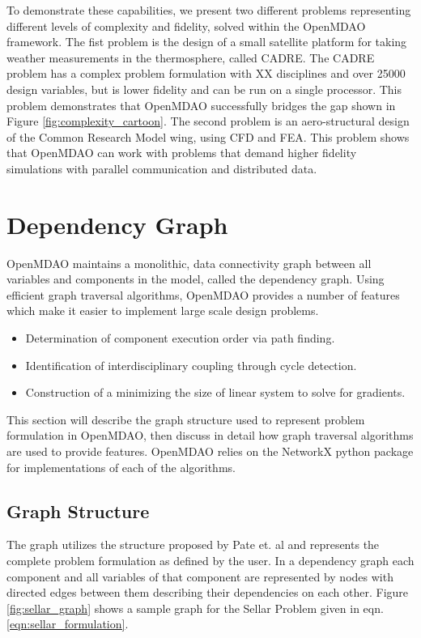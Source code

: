 \documentclass[]{aiaa-tc} %
\begin{document}
    To demonstrate these capabilities, we present two different problems representing different levels of 
    complexity and fidelity, solved within the OpenMDAO framework. The fist problem is the design of a small 
    satellite platform for taking weather measurements in the thermosphere, called CADRE. The CADRE problem has a 
    complex problem formulation with XX disciplines and over 25000 design variables, but is lower fidelity and can 
    be run on a single processor. This problem demonstrates that OpenMDAO successfully bridges the gap shown 
    in Figure \ref{fig:complexity_cartoon}. The second problem is an aero-structural design of the Common Research 
    Model wing, using CFD and FEA. This problem shows that OpenMDAO can work with problems that demand higher fidelity 
    simulations with parallel communication and distributed data. 

  \section{Dependency Graph}

    OpenMDAO maintains a monolithic, data connectivity graph between all 
    variables and components in the model, called the dependency graph.
    Using efficient graph traversal algorithms, OpenMDAO provides a number of 
    features which make it easier to implement large scale design problems. 

    \begin{itemize}
      \item Determination of component execution order via path finding.
      \item Identification of interdisciplinary coupling through cycle detection.
      \item Construction of a minimizing the size of linear system to solve for gradients.
    \end{itemize}

    This section will describe the graph structure used to represent problem formulation in OpenMDAO, 
    then discuss in detail how graph traversal algorithms are used to provide features. OpenMDAO relies
    on the NetworkX \cite{hagberg-2008-exploring} python package for implementations of each of 
    the algorithms. 
      

    \subsection{Graph Structure}
    The graph utilizes the structure proposed by 
    Pate et. al \cite{graph_problem2013} and represents the complete problem formulation as 
    defined by the user. In a dependency graph each component and all variables of that component are 
    represented by nodes with directed edges between them describing their dependencies on each other. 
    Figure \ref{fig:sellar_graph} shows a sample graph for the Sellar Problem \cite{AIAA:sellar} 
    given in eqn. \ref{eqn:sellar_formulation}.  
\end{document}
